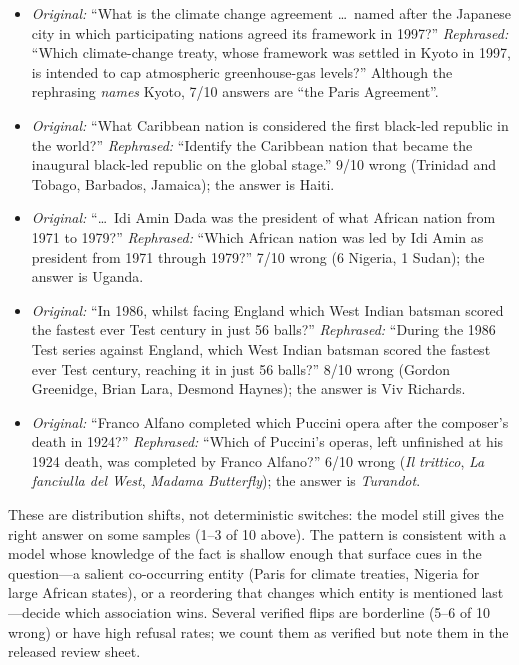 \documentclass[sigconf,nonacm]{acmart}
\begin{document}
\begin{itemize}
\item \emph{Original:} ``What is the climate change agreement \ldots\ named after the Japanese city in which participating nations agreed its framework in 1997?'' \emph{Rephrased:} ``Which climate-change treaty, whose framework was settled in Kyoto in 1997, is intended to cap atmospheric greenhouse-gas levels?'' Although the rephrasing \emph{names} Kyoto, 7/10 answers are ``the Paris Agreement''.
\item \emph{Original:} ``What Caribbean nation is considered the first black-led republic in the world?'' \emph{Rephrased:} ``Identify the Caribbean nation that became the inaugural black-led republic on the global stage.'' 9/10 wrong (Trinidad and Tobago, Barbados, Jamaica); the answer is Haiti.
\item \emph{Original:} ``\ldots\ Idi Amin Dada was the president of what African nation from 1971 to 1979?'' \emph{Rephrased:} ``Which African nation was led by Idi Amin as president from 1971 through 1979?'' 7/10 wrong (6 Nigeria, 1 Sudan); the answer is Uganda.
\item \emph{Original:} ``In 1986, whilst facing England which West Indian batsman scored the fastest ever Test century in just 56 balls?'' \emph{Rephrased:} ``During the 1986 Test series against England, which West Indian batsman scored the fastest ever Test century, reaching it in just 56 balls?'' 8/10 wrong (Gordon Greenidge, Brian Lara, Desmond Haynes); the answer is Viv Richards.
\item \emph{Original:} ``Franco Alfano completed which Puccini opera after the composer's death in 1924?'' \emph{Rephrased:} ``Which of Puccini's operas, left unfinished at his 1924 death, was completed by Franco Alfano?'' 6/10 wrong (\emph{Il trittico}, \emph{La fanciulla del West}, \emph{Madama Butterfly}); the answer is \emph{Turandot}.
\end{itemize}

These are distribution shifts, not deterministic switches: the model still gives the right answer on some samples (1--3 of 10 above). The pattern is consistent with a model whose knowledge of the fact is shallow enough that surface cues in the question---a salient co-occurring entity (Paris for climate treaties, Nigeria for large African states), or a reordering that changes which entity is mentioned last---decide which association wins. Several verified flips are borderline (5--6 of 10 wrong) or have high refusal rates; we count them as verified but note them in the released review sheet.
\end{document}
